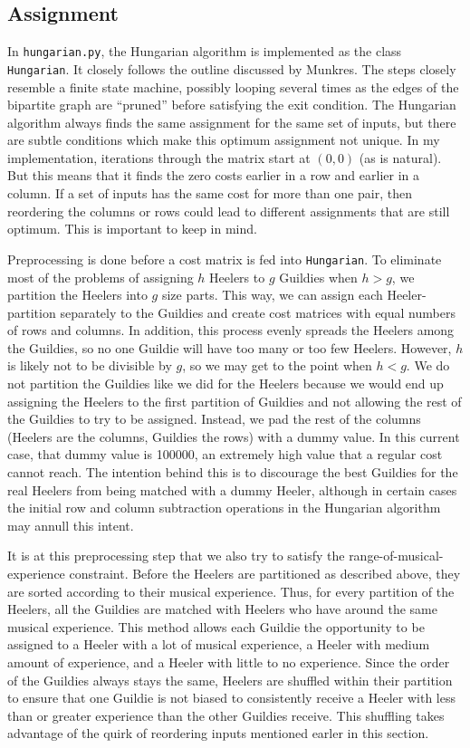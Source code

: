 \documentclass[letterpaper]{article}
\begin{document}
\subsection{Assignment}
In \texttt{hungarian.py}, the Hungarian algorithm is implemented as the class \texttt{Hungarian}. It closely follows the outline discussed by Munkres.
The steps closely resemble a finite state machine, possibly looping several times as the edges of the bipartite graph
are ``pruned'' before satisfying the exit condition. The Hungarian algorithm always finds the same assignment for the
same set of inputs, but there are subtle conditions which make this optimum assignment not unique. In my implementation,
iterations through the matrix start at $(0, 0)$ (as is natural). But this means that it finds the zero costs earlier in a
row and earlier in a column. If a set of inputs has the same cost for more than one pair, then reordering the columns or
rows could lead to different assignments that are still optimum. This is important to keep in mind.

Preprocessing is done before a cost matrix is fed into \texttt{Hungarian}. To eliminate most of the problems of
assigning $h$ Heelers to $g$ Guildies when $h > g$, we partition the Heelers into $g$ size parts. This way, we can
assign each Heeler-partition separately to the Guildies and create cost matrices with equal numbers of rows and columns.
In addition, this process evenly spreads the Heelers among the Guildies, so no one Guildie will have too many or too few
Heelers.
However, $h$ is likely not to be divisible by $g$, so we may get to the point when $h < g$. We do not partition the
Guildies like we did for the Heelers because we would end up assigning the Heelers to the first partition of Guildies
and not allowing the rest of the Guildies to try to be assigned. Instead, we pad the rest of the columns (Heelers are
the columns, Guildies the rows) with a dummy value. In this current case, that dummy value is 100000, an extremely high
value that a regular cost cannot reach. The intention behind this is to discourage the best Guildies for the real Heelers
from being matched with a dummy Heeler, although in certain cases the initial row and column subtraction operations in
the Hungarian algorithm may annull this intent.

It is at this preprocessing step that we also try to satisfy the range-of-musical-experience constraint. Before the Heelers
are partitioned as described above, they are sorted according to their musical experience. Thus, for every partition of
the Heelers, all the Guildies are matched with Heelers who have around the same musical experience. This method allows
each Guildie the opportunity to be assigned to a Heeler with a lot of musical experience, a Heeler with medium amount of
experience, and a Heeler with little to no experience. Since the order of the Guildies always stays the same, Heelers
are shuffled within their partition to ensure that one Guildie is not biased to consistently receive a Heeler with less
than or greater experience than the other Guildies receive. This shuffling takes advantage of the quirk of reordering
inputs mentioned earler in this section.
\end{document}
